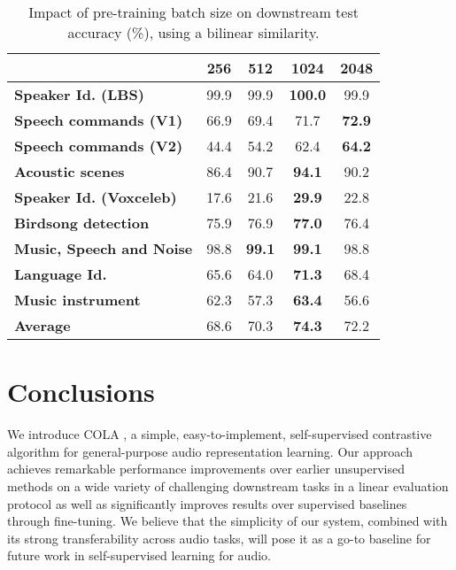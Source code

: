 \documentclass{article}
\newcommand{\ours}{COLA }
\begin{document}
\begin{table}[t]
\centering
\caption{Impact of pre-training batch size on downstream test accuracy (\%), using a bilinear similarity.}
\vspace{0.1cm}

\footnotesize
\label{tab:ablation_batch_size}
\begin{tabular}{@{}lcccc@{}}
\toprule
& \textbf{256} & \textbf{512}  & \textbf{1024}  & \textbf{2048} \\ \midrule
\textbf{Speaker Id. (LBS)}       & 99.9         & 99.9          & \textbf{100.0} & 99.9          \\
\textbf{Speech commands (V1)}    & 66.9         & 69.4          & 71.7           & \textbf{72.9} \\
\textbf{Speech commands (V2)}    & 44.4         & 54.2          & 62.4           & \textbf{64.2} \\
\textbf{Acoustic scenes}         & 86.4         & 90.7          & \textbf{94.1}  & 90.2          \\
\textbf{Speaker Id. (Voxceleb)}  & 17.6         & 21.6          & \textbf{29.9}  & 22.8          \\
\textbf{Birdsong detection}      & 75.9         & 76.9          & \textbf{77.0}  & 76.4          \\
\textbf{Music, Speech and Noise} & 98.8         & \textbf{99.1} & \textbf{99.1}  & 98.8          \\
\textbf{Language Id.}            & 65.6         & 64.0          & \textbf{71.3}  & 68.4          \\
\textbf{Music instrument}        & 62.3         & 57.3          & \textbf{63.4}  & 56.6          \\ \midrule
\textbf{Average}                 & 68.6         & 70.3          & \textbf{74.3}  & 72.2          \\ \bottomrule
\end{tabular}
\end{table}

\section{Conclusions}
We introduce \ours\!\!, a simple, easy-to-implement, self-supervised contrastive algorithm for general-purpose audio representation learning. Our approach achieves remarkable performance improvements over earlier unsupervised methods on a wide variety of challenging downstream tasks in a linear evaluation protocol as well as significantly improves results over supervised baselines through fine-tuning. We believe that the simplicity of our system, combined with its strong transferability across audio tasks, will pose it as a go-to baseline for future work in self-supervised learning for audio.

\ninept


\end{document}
